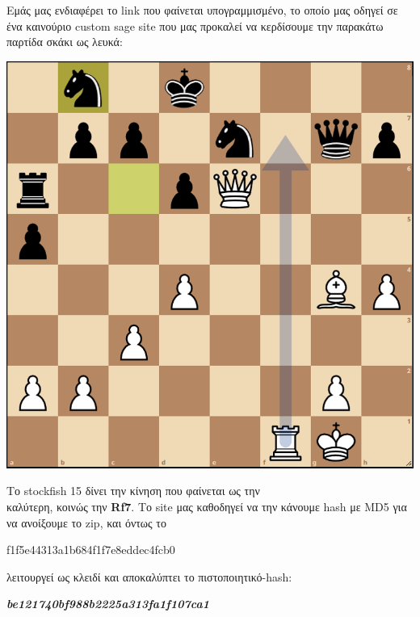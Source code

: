 \documentclass{article}
\newcommand{\lt}[1]{\latintext #1\greektext}
\newcommand{\blt}[1]{\lt{\textbf{#1}}}
\begin{document}
\newpage

Εμάς μας ενδιαφέρει το \lt{link} που φαίνεται υπογραμμισμένο, το οποίο μας οδηγεί σε ένα καινούριο \lt{custom sage site} που μας προκαλεί να κερδίσουμε την παρακάτω παρτίδα σκάκι ως λευκά:
\begin{center}
    \includegraphics[scale=0.5]{files/chessgame.png}
\end{center}

Το \lt{stockfish 15} δίνει την κίνηση που φαίνεται ως την\\ καλύτερη, κοινώς την
\blt{Rf7}. Το \lt{site} μας καθοδηγεί να την κάνουμε \lt{hash} με \lt{MD5} για να ανοίξουμε το \lt{zip}, και όντως το
\begin{center}
    \lt{f1f5e44313a1b684f1f7e8eddec4fcb0}
\end{center}
λειτουργεί ως κλειδί και αποκαλύπτει το πιστοποιητικό-\lt{hash}:
\begin{center}
    \blt{\textit{be121740bf988b2225a313fa1f107ca1}}
\end{center}
\end{document}
